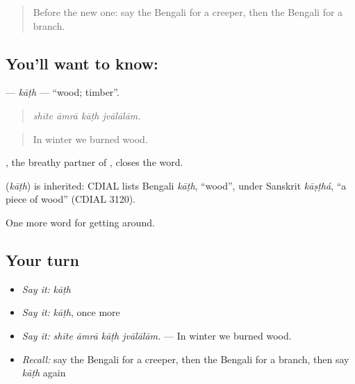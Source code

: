 \label{lesson:BN-C435-kath}



\begin{quote}
Before the new one: say the Bengali for a creeper, then the Bengali for a branch.
\end{quote}

\subsection*{You'll want to know: }
\textbf{} — \emph{kāṭh} — \textquotedblleft{}wood; timber\textquotedblright{}.

\begin{quote}
   
\end{quote}

\begin{quote}
\emph{shīte āmrā kāṭh jvālālām.}
\end{quote}

\begin{quote}
In winter we burned wood.
\end{quote}

, the breathy partner of , closes the word.

\begin{cousinweb}
\textbf{} (\emph{kāṭh}) is inherited: CDIAL lists Bengali \emph{kāṭh}, \textquotedblleft{}wood\textquotedblright{}, under Sanskrit \emph{kāṣṭhá}, \textquotedblleft{}a piece of wood\textquotedblright{} (CDIAL 3120).
\end{cousinweb}

\begin{grammarlens}[title={What you've built}]
One more word for getting around.
\end{grammarlens}

\subsection*{Your turn}
\begin{itemize}
\raggedright
  \item \emph{Say it:} \emph{kāṭh}
  \item \emph{Say it:} \emph{kāṭh}, once more
  \item \emph{Say it:} \emph{shīte āmrā kāṭh jvālālām.} — In winter we burned wood.
  \item \emph{Recall:} say the Bengali for a creeper, then the Bengali for a branch, then say \emph{kāṭh} again
\end{itemize}

